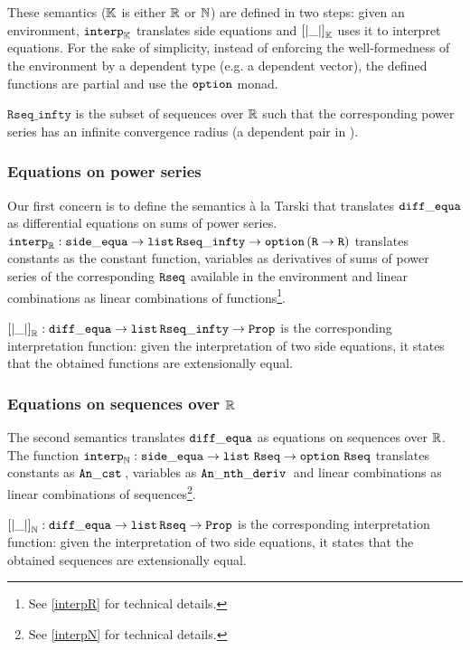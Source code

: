 \documentclass{article}
\begin{document}
These semantics ($\mathbb{K}$ is either $\mathbb{R}$ or $\mathbb{N}$) are defined in two steps:
given an environment, $\operatorname{\operatorname{\mathtt{interp}}_{\mathbb{K}}}$ translates side equations and
$\left[\left| \_ \right|\right]_{\mathbb{K}}$ uses it to interpret equations. For the
sake of simplicity, instead of enforcing the well-formedness of the environment
by a dependent type (e.g. a dependent vector), the defined functions are partial
and use the $\operatorname{\mathtt{option}}$ monad.

$\mathtt{Rseq\_infty}$ is the subset of sequences over $\mathbb{R}$ such that the
corresponding power series has an infinite convergence radius (a dependent
pair in \coq{}).

\subsubsection{Equations on power series}

Our first concern is to define the semantics \`a la Tarski that translates
$\operatorname{\mathtt{diff\_equa}}$ as differential equations on sums of power series.
$\operatorname{\operatorname{\mathtt{interp}}_{\mathbb{R}}} : \operatorname{\mathtt{side\_equa}} \rightarrow \operatorname{\mathtt{list}}{} \mathtt{Rseq\_infty} \rightarrow \operatorname{\mathtt{option}}{}
(\texttt{R} \rightarrow \texttt{R})$ translates constants as the constant function,
variables as derivatives of sums of power series of the corresponding $\operatorname{\mathtt{Rseq}}$
available in the environment and linear combinations as linear combinations of
functions\footnote{See \ref{interpR} for technical details.}.

$\left[\left| \_ \right|\right]_{\mathbb{R}} : \operatorname{\mathtt{diff\_equa}} \rightarrow \operatorname{\mathtt{list}}{}
\mathtt{Rseq\_infty} \rightarrow \texttt{Prop}$ is the corresponding interpretation
function: given the interpretation of two side equations, it states that the
obtained functions are extensionally equal.

\subsubsection{Equations on sequences over $\mathbb{R}$}

The second semantics translates $\operatorname{\mathtt{diff\_equa}}$ as equations on
sequences over $\mathbb{R}$.  The function $\operatorname{\operatorname{\mathtt{interp}}_{\mathbb{N}}} :
\operatorname{\mathtt{side\_equa}} \rightarrow \operatorname{\mathtt{list}}{} \operatorname{\mathtt{Rseq}} \rightarrow \operatorname{\mathtt{option}}{} \operatorname{\mathtt{Rseq}}$ translates
constants as $\operatorname{\mathtt{An\_cst}}{}$, variables as $\operatorname{\mathtt{An\_nth\_deriv}}{}$ and linear combinations as linear
combinations of sequences\footnote{See \ref{interpN} for technical details.}.

$\left[\left| \_ \right|\right]_{\mathbb{N}} : \operatorname{\mathtt{diff\_equa}} \rightarrow \operatorname{\mathtt{list}}{}
\mathtt{Rseq} \rightarrow \texttt{Prop}$ is the corresponding interpretation
function:  given the interpretation of two side equations, it states that the
obtained sequences are extensionally equal.
\end{document}
